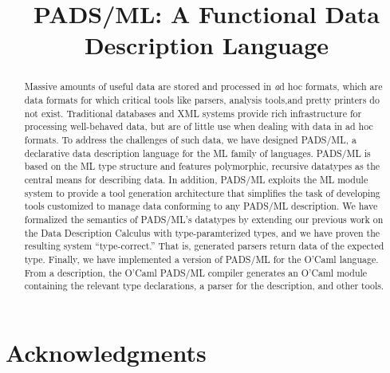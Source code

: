 \documentclass[nocopyrightspace]{sigplanconf}
\begin{document}
\title{PADS/ML: A Functional Data Description Language}
       {}
       {}



\maketitle{}

\begin{abstract}  

  Massive amounts of useful data are stored and processed in
  {\textit ad hoc formats}, which are data formats for which critical tools
  like parsers, analysis tools,and pretty printers do not
  exist. Traditional databases and XML systems provide rich
  infrastructure for processing well-behaved data, but are of little
  use when dealing with data in ad hoc formats.
  To address the challenges of such data, we have designed PADS/ML,
  a declarative data description language for the ML family of
  languages. PADS/ML is based on the ML type structure and features
  polymorphic, recursive datatypes as the central means for describing
  data. In addition, PADS/ML exploits the ML module system to
  provide a tool generation architecture that simplifies the task of
  developing tools customized to manage data conforming to any
  PADS/ML description. 
  We have formalized the semantics of PADS/ML's datatypes by extending
  our previous work on the Data Description Calculus with
  type-paramterized types, and we have proven the resulting system
  ``type-correct.'' That is, generated parsers return data of the
  expected type.
  Finally, we have implemented a version of PADS/ML for the O'Caml
  language.  From a description, the O'Caml PADS/ML compiler generates
  an O'Caml module containing the relevant type declarations, a parser
  for the description, and other tools.

\end{abstract}















\section*{Acknowledgments}




%


\end{document}
